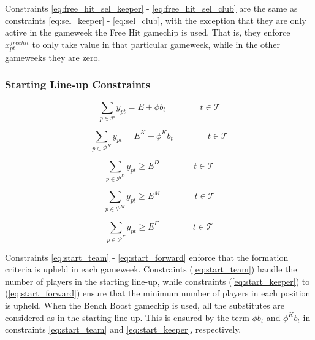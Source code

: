 Constraints \eqref{eq:free_hit_sel_keeper} - \eqref{eq:free_hit_sel_club} are the same as constraints \eqref{eq:sel_keeper} - \eqref{eq:sel_club}, with the exception that they are only active in the gameweek the Free Hit gamechip is used. That is, they enforce $x^{freehit}_{pt}$ to only take value in that particular gameweek, while in the other gameweeks they are zero. 

\subsubsection{Starting Line-up Constraints}\label{team_start}

\begin{equation} \label{eq:start_team}
    \sum_{p \in \mathcal{P}}y_{pt}= E  + \phi b_{t} \qquad\qquad t \in \mathcal{T}
\end{equation}

\begin{equation}\label{eq:start_keeper}
    \sum_{p \in \mathcal{P}^{K}} y_{pt}= E^{K} + \phi^{K} b_{t} \qquad\qquad t \in \mathcal{T}
\end{equation}

\begin{equation} \label{eq:start_defender}
    \sum_{p \in \mathcal{P}^{D}} y_{pt} \geq E^{D}  \qquad\qquad t \in \mathcal{T}
\end{equation}

\begin{equation}\label{eq:start_midfielder}
    \sum_{p \in \mathcal{P}^{M}} y_{pt}\geq E^{M} \qquad\qquad t \in \mathcal{T}
\end{equation}

\begin{equation}\label{eq:start_forward}
    \sum_{p \in \mathcal{P}^{F}} y_{pt}\geq E^{F} \qquad\qquad t \in \mathcal{T}
\end{equation}

Constraints \eqref{eq:start_team} - \eqref{eq:start_forward} enforce that the formation criteria is upheld in each gameweek. Constraints (\ref{eq:start_team}) handle the number of players in the starting line-up, while constraints (\ref{eq:start_keeper}) to (\ref{eq:start_forward}) ensure that the minimum number of players in each position is upheld. When the Bench Boost gamechip is used, all the substitutes are considered as in the starting line-up. This is ensured by the term $\phi b_{t}$ and $\phi^{K} b_{t}$ in constraints \eqref{eq:start_team} and \eqref{eq:start_keeper}, respectively.  

